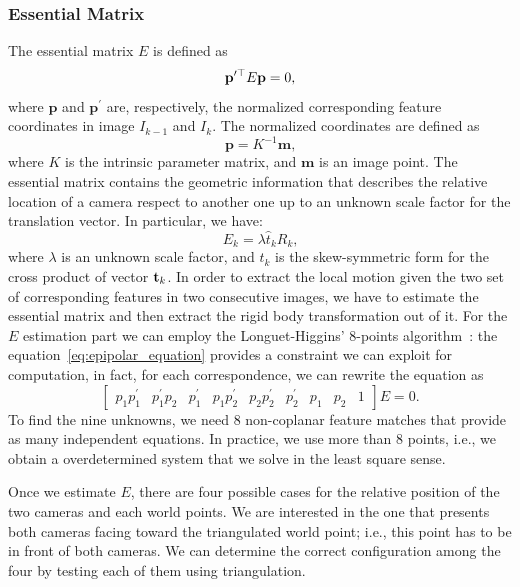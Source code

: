 \subsubsection{Essential Matrix}
\label{subsec:essential_matrix}
The essential matrix $E$ is defined as
%
\begin{equation}
\label{eq:epipolar_equation}
	\mathbf{p}^{\prime\top} E \mathbf{p} = 0 \text{,}
\end{equation}
%
\noindent where $\mathbf{p}$ and $\mathbf{p}^\prime$ are, respectively, the normalized corresponding 
feature coordinates in image $I_{k-1}$ and $I_{k}$. The normalized coordinates are defined as
%
\begin{equation}
	\mathbf{p} = K^{-1} \mathbf{m} \text{,}
\end{equation}
%
\noindent where $K$ is the intrinsic parameter matrix, and $\mathbf{m}$ is an
image point.
The essential matrix contains the geometric information that describes the 
relative location of a camera respect to another one up to an unknown scale factor 
for the translation vector. In particular, we have:
\begin{equation*}
	E_k = \lambda \hat{t}_kR_k \text{,}
\end{equation*}
\noindent where $\lambda$ is an unknown scale factor, and $\hat{t}_k$ is 
the skew-symmetric form for the cross product of vector $\mathbf{t}_k$.
In order to extract the local motion given the two set of corresponding features
in two consecutive images, we have to estimate the essential matrix and then 
extract the rigid body transformation out of it.
For the $E$ estimation part we can employ the Longuet-Higgins' 8-points 
algorithm~\cite{longuet1981computer}: the equation~\ref{eq:epipolar_equation} 
provides a constraint we
can exploit for computation, in fact, for each correspondence, we can rewrite 
the equation as
%
\begin{equation*}
	\begin{bmatrix}
		p_1p^\prime_1 & 
        p^\prime_1p_2 & 
        p^\prime_1 & 
        p_1p^\prime_2 & 
        p_2p^\prime_2 & 
        p^\prime_2 & 
        p_1 & p_2 & 
        1
	\end{bmatrix}
	E = 0	\text{.}
\end{equation*}
%
To find the nine unknowns, we need 8 non-coplanar feature matches that provide as many 
independent equations. In practice, we use more than 8 points, i.e., we obtain a overdetermined 
system that we solve in the least square sense.

Once we estimate $E$, there are four possible cases for the relative 
position of the two cameras and each world points. We are interested in the one
that presents both cameras facing toward the triangulated world point; i.e., this point has to be in front of both cameras. We can determine the correct configuration among the four by testing each of them using triangulation.

